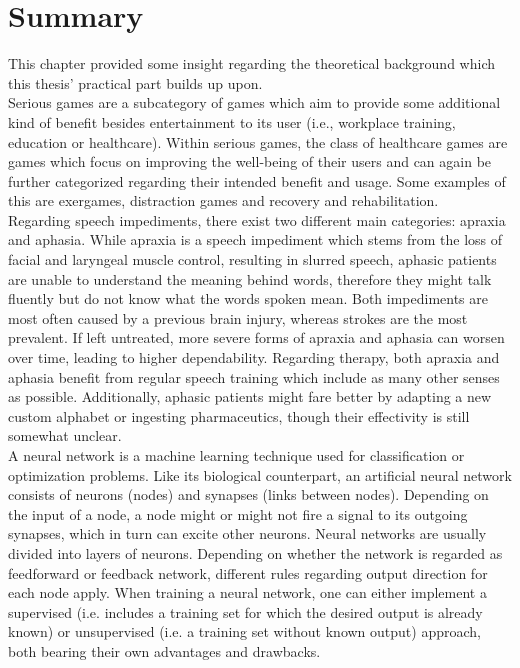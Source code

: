 \documentclass[draft,final]{vutinfth} %
\begin{document}
\section{Summary} This chapter provided some insight regarding the theoretical background which this thesis' practical part builds up upon. \\
Serious games are a subcategory of games which aim to provide some additional kind of benefit besides entertainment to its user (i.e., workplace training, education or healthcare). Within serious games, the class of healthcare games are games which focus on improving the well-being of their users and can again be further categorized regarding their intended benefit and usage. Some examples of this are exergames, distraction games and recovery and rehabilitation. 
\\
Regarding speech impediments, there exist two different main categories: apraxia and aphasia. While apraxia is a speech impediment which stems from the loss of facial and laryngeal muscle control, resulting in slurred speech, aphasic patients are unable to understand the meaning behind words, therefore they might talk fluently but do not know what the words spoken mean. Both impediments are most often caused by a previous brain injury, whereas strokes are the most prevalent.  If left untreated, more severe forms of apraxia and aphasia can worsen over time, leading to higher dependability. Regarding therapy, both apraxia and aphasia benefit from regular speech training which include as many other senses as possible. Additionally, aphasic patients might fare better by adapting a new custom alphabet or ingesting pharmaceutics, though their effectivity is still somewhat unclear.
\\
A neural network is a machine learning technique used for classification or optimization problems. Like its biological counterpart, an artificial neural network consists of neurons (nodes) and synapses (links between nodes). Depending on the input of a node, a node might or might not fire a signal to its outgoing synapses, which in turn can excite other neurons. Neural networks are usually divided into layers of neurons. Depending on whether the network is regarded as feedforward or feedback network, different rules regarding output direction for each node apply. When training a neural network, one can either implement a supervised (i.e. includes a training set for which the desired output is already known) or unsupervised (i.e. a training set without known output) approach, both bearing their own advantages and drawbacks. \\
\end{document}

